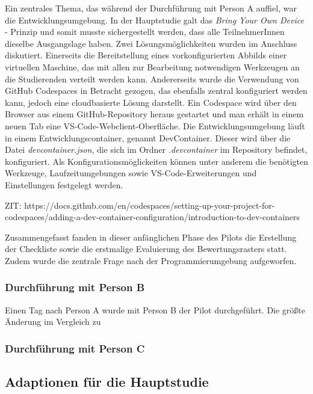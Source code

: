 Ein zentrales Thema, das während der Durchführung mit Person A auffiel, war die Entwicklungsumgebung. In der Hauptstudie galt das \textit{Bring Your Own Device} - Prinzip und somit musste sichergestellt werden, dass alle TeilnehmerInnen dieselbe Ausgangslage haben. Zwei Lösungsmöglichkeiten wurden im Anschluss diskutiert. Einerseits die Bereitstellung eines vorkonfigurierten Abbilds einer virtuellen Maschine, das mit allen zur Bearbeitung notwendigen Werkzeugen an die Studierenden verteilt werden kann. Andererseits wurde die Verwendung von GitHub Codespaces in Betracht gezogen, das ebenfalls zentral konfiguriert werden kann, jedoch eine cloudbasierte Lösung darstellt. Ein Codespace wird über den Browser aus einem GitHub-Repository heraus gestartet und man erhält in einem neuen Tab eine VS-Code-Webclient-Oberfläche. Die Entwicklungsumgebung läuft in einem Entwicklungscontainer, genannt DevContainer. Dieser wird über die Datei \textit{devcontainer.json}, die sich im Ordner \textit{.devcontainer} im Repository befindet, konfiguriert. Als Konfigurationsmöglickeiten können unter anderem die benötigten Werkzeuge, Laufzeitumgebungen sowie VS-Code-Erweiterungen und Einstellungen festgelegt werden.

ZIT: https://docs.github.com/en/codespaces/setting-up-your-project-for-codespaces/adding-a-dev-container-configuration/introduction-to-dev-containers




Zusammengefasst fanden in dieser anfänglichen Phase des Pilots die Erstellung der Checkliste sowie die erstmalige Evaluierung des Bewertungsrasters statt. Zudem wurde die zentrale Frage nach der Programmierumgebung aufgeworfen.

\subsubsection{Durchführung mit Person B}
Einen Tag nach Person A wurde mit Person B der Pilot durchgeführt. Die größte Änderung im Vergleich zu



\subsubsection{Durchführung mit Person C}





\subsection{Adaptionen für die Hauptstudie}\label{cha:Adaptionen}

